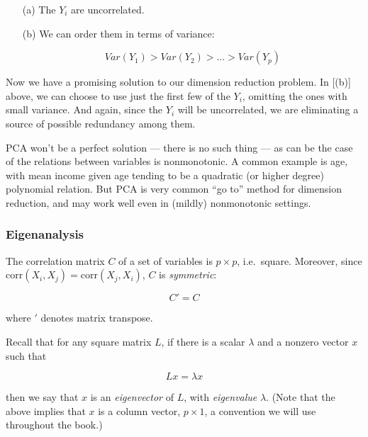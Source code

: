 \begin{itemize}

\item [(a)] The $Y_i$ are uncorrelated.

\item [(b)] We can order them in terms of variance:

\begin{equation}
Var(Y_1) > Var(Y_2) > ... > Var(Y_p)
\end{equation}

\end{itemize} 

Now we have a promising solution to our dimension reduction problem.
In [(b)] above, we can choose to use just the first few of the $Y_i$,
omitting the ones with small variance.  And again, since the $Y_i$ will
be uncorrelated, we are eliminating a source of possible redundancy
among them.

PCA won't be a perfect solution --- there is no such thing --- as can be
the case of the relations between variables is nonmonotonic.  A common
example is age, with mean income given age tending to be a quadratic (or
higher degree) polynomial relation.  But PCA is very common ``go to''
method for dimension reduction, and may work well even in (mildly)
nonmonotonic settings.

\subsubsection{Eigenanalysis}

The correlation matrix $C$ of a set of variables is $p \times p$, i.e.\
square.  Moreover, since $\textrm{corr}(X_i,X_j) = \textrm{corr}(X_j,X_i)$,
$C$ is \textit{symmetric}:

\begin{equation}
C' = C
\end{equation}

where $'$ denotes matrix transpose.  

Recall that for any square matrix $L$, if there is a scalar $\lambda$
and a nonzero vector $x$ such that 

\begin{equation}
Lx = \lambda x
\end{equation}

then we say that $x$ is an \textit{eigenvector} of $L$, with
\textit{eigenvalue} $\lambda$.  (Note that the above implies that $x$ is
a column vector, $p \times 1$, a convention we will use throughout the
book.)

